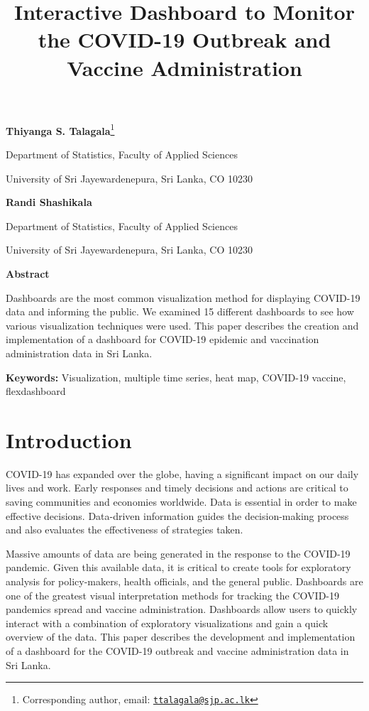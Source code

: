 \documentclass[
]{article}
\title{Interactive Dashboard to Monitor the COVID-19 Outbreak and
Vaccine Administration}
\author{}
\date{\vspace{-2.5em}}
\begin{document}
\maketitle

\textbf{Thiyanga S. Talagala}\footnote{Corresponding author, email:
  \href{mailto:ttalagala@sjp.ac.lk}{\nolinkurl{ttalagala@sjp.ac.lk}}}

Department of Statistics, Faculty of Applied Sciences

University of Sri Jayewardenepura, Sri Lanka, CO 10230

\hspace{3cm}

\textbf{Randi Shashikala}

Department of Statistics, Faculty of Applied Sciences

University of Sri Jayewardenepura, Sri Lanka, CO 10230

\hspace{3cm}

\textbf{Abstract}

Dashboards are the most common visualization method for displaying
COVID-19 data and informing the public. We examined 15 different
dashboards to see how various visualization techniques were used. This
paper describes the creation and implementation of a dashboard for
COVID-19 epidemic and vaccination administration data in Sri Lanka.

\textbf{Keywords:} Visualization, multiple time series, heat map,
COVID-19 vaccine, flexdashboard

\hypertarget{introduction}{%
\section{Introduction}\label{introduction}}

COVID-19 has expanded over the globe, having a significant impact on our
daily lives and work. Early responses and timely decisions and actions
are critical to saving communities and economies worldwide. Data is
essential in order to make effective decisions. Data-driven information
guides the decision-making process and also evaluates the effectiveness
of strategies taken.

Massive amounts of data are being generated in the response to the
COVID-19 pandemic. Given this available data, it is critical to create
tools for exploratory analysis for policy-makers, health officials, and
the general public. Dashboards are one of the greatest visual
interpretation methods for tracking the COVID-19 pandemics spread and
vaccine administration. Dashboards allow users to quickly interact with
a combination of exploratory visualizations and gain a quick overview of
the data. This paper describes the development and implementation of a
dashboard for the COVID-19 outbreak and vaccine administration data in
Sri Lanka.
\end{document}
